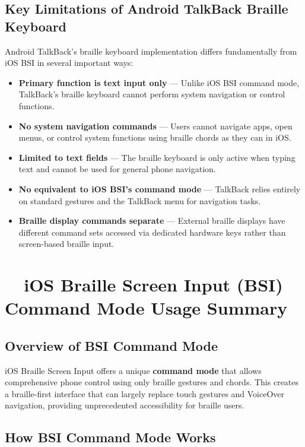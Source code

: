 \subsection{Key Limitations of Android TalkBack Braille Keyboard}

Android TalkBack's braille keyboard implementation differs fundamentally from iOS BSI in several important ways:

\begin{itemize}
	\item \textbf{Primary function is text input only} — Unlike iOS BSI command mode, TalkBack's braille keyboard cannot perform system navigation or control functions.
	\item \textbf{No system navigation commands} — Users cannot navigate apps, open menus, or control system functions using braille chords as they can in iOS.
	\item \textbf{Limited to text fields} — The braille keyboard is only active when typing text and cannot be used for general phone navigation.
	\item \textbf{No equivalent to iOS BSI's command mode} — TalkBack relies entirely on standard gestures and the TalkBack menu for navigation tasks.
	\item \textbf{Braille display commands separate} — External braille displays have different command sets accessed via dedicated hardware keys rather than screen-based braille input.
\end{itemize}

\section{~~iOS Braille Screen Input (BSI) Command Mode Usage Summary}

\subsection{Overview of BSI Command Mode}
iOS Braille Screen Input offers a unique \textbf{command mode} that allows comprehensive phone control using only braille gestures and chords. This creates a braille-first interface that can largely replace touch gestures and VoiceOver navigation, providing unprecedented accessibility for braille users.

\subsection{How BSI Command Mode Works}

